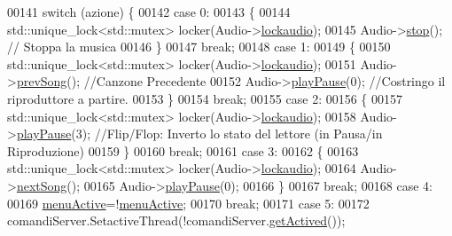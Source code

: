 \begin{DoxyCode}
00141         \textcolor{keywordflow}{switch} (azione) \{
00142             \textcolor{keywordflow}{case} 0:
00143                 \{
00144                     std::unique\_lock<std::mutex> locker(Audio->\hyperlink{classRiproduttore_a514d48c11b89c737c8e266e1ca3415f1}{lockaudio});
00145                     Audio->\hyperlink{classRiproduttore_a837bea01fa68487694b661ec94781f5d}{stop}(); \textcolor{comment}{// Stoppa la musica}
00146                 \}
00147                 \textcolor{keywordflow}{break};
00148             \textcolor{keywordflow}{case} 1:
00149                 \{
00150                     std::unique\_lock<std::mutex> locker(Audio->\hyperlink{classRiproduttore_a514d48c11b89c737c8e266e1ca3415f1}{lockaudio});
00151                     Audio->\hyperlink{classRiproduttore_a6bb45ff25c5a3b9ffcf9203214f13340}{prevSong}(); \textcolor{comment}{//Canzone Precedente}
00152                     Audio->\hyperlink{classRiproduttore_a0e1a448f370d517dbe2ed75f1f097abf}{playPause}(0); \textcolor{comment}{//Costringo il riproduttore a partire.}
00153                 \}
00154                 \textcolor{keywordflow}{break};
00155             \textcolor{keywordflow}{case} 2:
00156                 \{
00157                     std::unique\_lock<std::mutex> locker(Audio->\hyperlink{classRiproduttore_a514d48c11b89c737c8e266e1ca3415f1}{lockaudio});
00158                     Audio->\hyperlink{classRiproduttore_a0e1a448f370d517dbe2ed75f1f097abf}{playPause}(3); \textcolor{comment}{//Flip/Flop: Inverto lo stato del
       lettore (in Pausa/in Riproduzione)}
00159                 \}
00160                 \textcolor{keywordflow}{break};
00161             \textcolor{keywordflow}{case} 3:
00162                 \{
00163                     std::unique\_lock<std::mutex> locker(Audio->\hyperlink{classRiproduttore_a514d48c11b89c737c8e266e1ca3415f1}{lockaudio});
00164                     Audio->\hyperlink{classRiproduttore_ab8a211727d84256bc62ab841881ee9c3}{nextSong}();
00165                     Audio->\hyperlink{classRiproduttore_a0e1a448f370d517dbe2ed75f1f097abf}{playPause}(0);
00166                 \}
00167                 \textcolor{keywordflow}{break};
00168             \textcolor{keywordflow}{case} 4:
00169                 \hyperlink{classdataManager_a7126a92f131b786ecf68b7a27d58d814}{menuActive}=!\hyperlink{classdataManager_a7126a92f131b786ecf68b7a27d58d814}{menuActive}; 
00170                 \textcolor{keywordflow}{break};
00171             \textcolor{keywordflow}{case} 5:
00172                 comandiServer.SetactiveThread(!comandiServer.\hyperlink{classServer_a23b2a4e9819bd2ad2dbb6a0ccc63adc2}{getActived}());

\end{DoxyCode}
